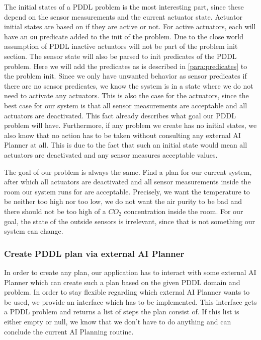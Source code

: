 The initial states of a PDDL problem is the most interesting part, since these depend on the sensor measurements and the current actuator state.
Actuator initial states are based on if they are active or not.
For active actuators, each will have an \texttt{on} predicate added to the init of the problem.
Due to the close world assumption of PDDL inactive actuators will not be part of the problem init section.
The sensor state will also be parsed to init predicates of the PDDL problem.
Here we will add the predicates as is described in \cref{para:predicates} to the problem init.
Since we only have unwanted behavior as sensor predicates if there are no sensor predicates, we know the system is in a state where we do not need to activate any actuators.
This is also the case for the actuators, since the best case for our system is that all sensor measurements are acceptable and all actuators are deactivated.
This fact already describes what goal our PDDL problem will have.
Furthermore, if any problem we create has no initial states, we also know that no action has to be taken without consulting any external AI Planner at all.
This is due to the fact that such an initial state would mean all actuators are deactivated and any sensor measures acceptable values.

The goal of our problem is always the same.
Find a plan for our current system, after which all actuators are deactivated and all sensor measurements inside the room our system runs for are acceptable.
Precisely, we want the temperature to be neither too high nor too low, we do not want the air purity to be bad and there should not be too high of a $CO_2$ concentration inside the room.
For our goal, the state of the outside sensors is irrelevant, since that is not something our system can change.

\subsubsection{Create PDDL plan via external AI Planner}\label{subsubsec:create-pddl-plan-via-external-ai-planner}
In order to create any plan, our application has to interact with some external AI Planner which can create such a plan based on the given PDDL domain and problem.
In order to stay flexible regarding which external AI Planner wants to be used, we provide an interface which has to be implemented.
This interface gets a PDDL problem and returns a list of steps the plan consist of.
If this list is either empty or null, we know that we don't have to do anything and can conclude the current AI Planning routine.

